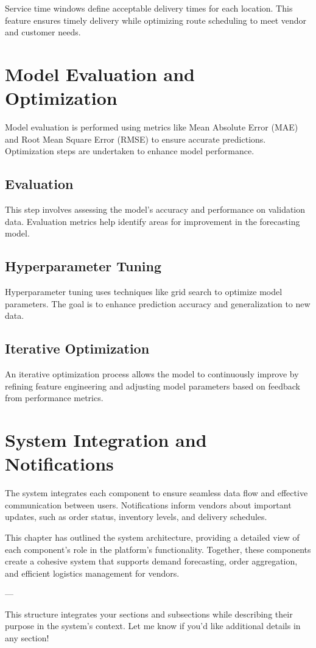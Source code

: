 Service time windows define acceptable delivery times for each location. This feature ensures timely delivery while optimizing route scheduling to meet vendor and customer needs.

\section{Model Evaluation and Optimization}

Model evaluation is performed using metrics like Mean Absolute Error (MAE) and Root Mean Square Error (RMSE) to ensure accurate predictions. Optimization steps are undertaken to enhance model performance.

\subsection{Evaluation}

This step involves assessing the model's accuracy and performance on validation data. Evaluation metrics help identify areas for improvement in the forecasting model.

\subsection{Hyperparameter Tuning}

Hyperparameter tuning uses techniques like grid search to optimize model parameters. The goal is to enhance prediction accuracy and generalization to new data.

\subsection{Iterative Optimization}

An iterative optimization process allows the model to continuously improve by refining feature engineering and adjusting model parameters based on feedback from performance metrics.

\section{System Integration and Notifications}

The system integrates each component to ensure seamless data flow and effective communication between users. Notifications inform vendors about important updates, such as order status, inventory levels, and delivery schedules.

\par 
This chapter has outlined the system architecture, providing a detailed view of each component’s role in the platform's functionality. Together, these components create a cohesive system that supports demand forecasting, order aggregation, and efficient logistics management for vendors.

--- 

This structure integrates your sections and subsections while describing their purpose in the system's context. Let me know if you’d like additional details in any section!